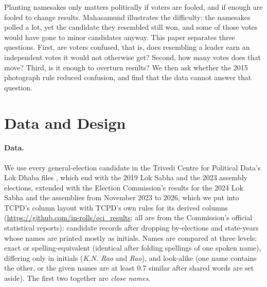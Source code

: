 \documentclass[11pt]{article}
\begin{document}
Planting namesakes only matters politically if voters are fooled, and if enough are fooled to change results. Mahasamund illustrates the difficulty: the namesakes polled a lot, yet the candidate they resembled still won, and some of those votes would have gone to minor candidates anyway. This paper separates three questions. First, are voters confused, that is, does resembling a leader earn an independent votes it would not otherwise get? Second, how many votes does that move? Third, is it enough to overturn results? We then ask whether the 2015 photograph rule reduced confusion, and find that the data cannot answer that question.

\section{Data and Design}

\paragraph{Data.} We use every general-election candidate in the Trivedi Centre for Political Data's Lok Dhaba files \citep{agarwal2021}, which end with the 2019 Lok Sabha and the 2023 assembly elections, extended with the Election Commission's results for the 2024 Lok Sabha and the assemblies from November 2023 to 2026, which we put into TCPD's column layout with TCPD's own rules for its derived columns (\url{https://github.com/in-rolls/eci_results}; all are from the Commission's official statistical reports): \nTcpdCand{} candidate records after dropping by-elections and state-years whose names are printed mostly as initials. Names are compared at three levels: exact or spelling-equivalent (identical after folding spellings of one spoken name), differing only in initials (\emph{K.N. Rao} and \emph{Rao}), and look-alike (one name contains the other, or the given names are at least 0.7 similar after shared words are set aside). The first two together are \emph{close names}.
\end{document}
